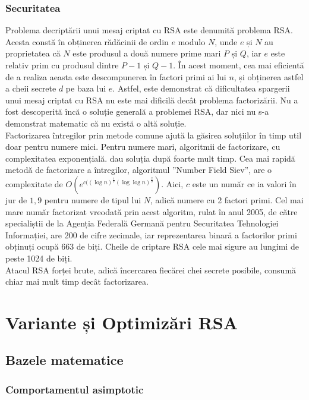 \documentclass[12pt, oneside]{book}
\begin{document}
\subsection{Securitatea}
Problema decriptării unui mesaj criptat cu RSA este denumită problema RSA. Acesta constă în obținerea rădăcinii de ordin $e$ modulo $N$, unde $e$ și $N$ au proprietatea că $N$ este produsul a două numere prime mari $P$ și $Q$, iar $e$ este relativ prim cu produsul dintre $P-1$ și $Q-1$. În acest moment, cea mai eficientă de a realiza aeasta este descompunerea în factori primi ai lui $n$, și obținerea astfel a cheii secrete $d$ pe baza lui $e$. Astfel, este demonstrat că dificultatea spargerii unui mesaj criptat cu RSA nu este mai dificilă decât problema factorizării. Nu a fost descoperită încă o soluție generală a problemei RSA, dar nici nu s-a demonstrat matematic că nu există o altă soluție. \\
Factorizarea întregilor prin metode comune ajută la găsirea soluțiilor în timp util doar pentru numere mici. Pentru numere mari, algoritmii de factorizare, cu complexitatea exponențială. dau soluția după foarte mult timp. Cea mai rapidă metodă de factorizare a întregilor, algoritmul ”Number Field Siev”, are o complexitate de $O(e^{c((\log n)^{\frac{1}{3}} (\log \log n)^{\frac{2}{3}}       })$. Aici, $c$ este un număr ce ia valori în jur de $1,9$ pentru numere de tipul lui $N$, adică numere cu 2 factori primi. Cel mai mare număr factorizat vreodată prin acest algoritm, rulat în anul 2005, de către specialiștii de la Agenția Federală Germană pentru Securitatea Tehnologiei Informației, are 200 de cifre zecimale, iar reprezentarea binară a factorilor primi obținuți ocupă 663 de biți. Cheile de criptare RSA cele mai sigure au lungimi de peste 1024 de biți.\\
Atacul RSA forței brute, adică încercarea fiecărei chei secrete posibile, consumă chiar mai mult timp decât factorizarea.





\chapter{Variante și Optimizări RSA}



\section{Bazele matematice} 
    \subsection{Comportamentul asimptotic}
\end{document}
